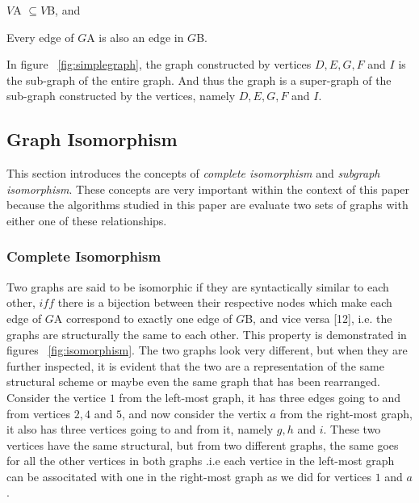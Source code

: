 \begin{myEnumerate}
  \item $V${\tiny A} $ \subseteq V${\tiny B}, and
  \item Every edge of $G${\tiny A} is also an edge in $G${\tiny B}.
\end{myEnumerate}

In figure  ~\ref{fig:simplegraph}, the graph constructed by vertices $D,E,G,F$ and $I$ is the sub-graph of the entire graph. And thus the graph is a super-graph of the sub-graph constructed by the vertices, namely $D,E,G,F$ and $I$.

\subsection{Graph Isomorphism}
This section introduces the concepts of \textit{complete isomorphism} and \textit{subgraph isomorphism}. These concepts are very important within the context 
of this paper because the algorithms studied in this paper are evaluate two sets of graphs with either one of these relationships.
\subsubsection{Complete Isomorphism}
Two graphs are said to be isomorphic if they are syntactically similar to each other, $iff$ there is a bijection between their respective nodes which 
make each edge of $G${\tiny A} correspond to exactly one edge of $G${\tiny B}, and vice versa [12], i.e. the graphs are structurally the same to each
other. This property is demonstrated in figures ~\ref{fig:isomorphism}. 
The two graphs look very different, but when they are further inspected, it is evident that the two are a representation of the same structural scheme or maybe even the same graph that has been rearranged. \newline\newline Consider the vertice $1$ from the left-most graph, it has three edges going to and from vertices $2,4$ and $5$, and now consider the vertix $a$ from the right-most graph, it also has three vertices going to and from it, namely $g,h$ and $i$. These two vertices have the same structural, but from two different graphs, the same goes for all the other vertices in both graphs .i.e each vertice in the left-most graph can be associtated with one in the right-most graph as we did for vertices $1$ and $a$.

